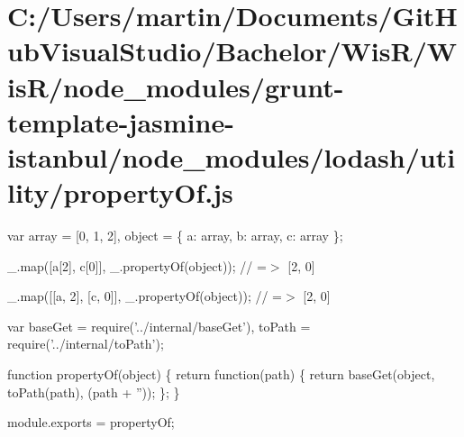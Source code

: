 \hypertarget{_c_1_2_users_2martin_2_documents_2_git_hub_visual_studio_2_bachelor_2_wis_r_2_wis_r_2node_modulec35bbe6b9c501c671ba9dea48dad808e}{}\section{C\+:/\+Users/martin/\+Documents/\+Git\+Hub\+Visual\+Studio/\+Bachelor/\+Wis\+R/\+Wis\+R/node\+\_\+modules/grunt-\/template-\/jasmine-\/istanbul/node\+\_\+modules/lodash/utility/property\+Of.\+js}
var array = \mbox{[}0, 1, 2\mbox{]}, object = \{ \textquotesingle{}a\textquotesingle{}\+: array, \textquotesingle{}b\textquotesingle{}\+: array, \textquotesingle{}c\textquotesingle{}\+: array \};

\+\_\+.\+map(\mbox{[}\textquotesingle{}a\mbox{[}2\mbox{]}\textquotesingle{}, \textquotesingle{}c\mbox{[}0\mbox{]}\textquotesingle{}\mbox{]}, \+\_\+.\+property\+Of(object)); // =$>$ \mbox{[}2, 0\mbox{]}

\+\_\+.\+map(\mbox{[}\mbox{[}\textquotesingle{}a\textquotesingle{}, \textquotesingle{}2\textquotesingle{}\mbox{]}, \mbox{[}\textquotesingle{}c\textquotesingle{}, \textquotesingle{}0\textquotesingle{}\mbox{]}\mbox{]}, \+\_\+.\+property\+Of(object)); // =$>$ \mbox{[}2, 0\mbox{]}


\begin{DoxyCodeInclude}
var baseGet = require(\textcolor{stringliteral}{'../internal/baseGet'}),
    toPath = require(\textcolor{stringliteral}{'../internal/toPath'});

\textcolor{keyword}{function} propertyOf(\textcolor{keywordtype}{object}) \{
  \textcolor{keywordflow}{return} \textcolor{keyword}{function}(path) \{
    \textcolor{keywordflow}{return} baseGet(\textcolor{keywordtype}{object}, toPath(path), (path + \textcolor{stringliteral}{''}));
  \};
\}

module.exports = propertyOf;
\end{DoxyCodeInclude}
 